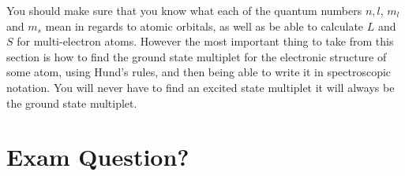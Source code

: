 You should make sure that you know what each of the quantum numbers $n, l$, $m_l$ and $m_s$ mean in regards to atomic orbitals, as well as be able to calculate $L$ and $S$ for multi-electron atoms. However the most important thing to take from this section is how to find the ground state multiplet for the electronic structure of some atom, using Hund's rules, and then being able to write it in spectroscopic notation. You will never have to find an excited state multiplet it will always be the ground state multiplet.


\section{Exam Question?}
